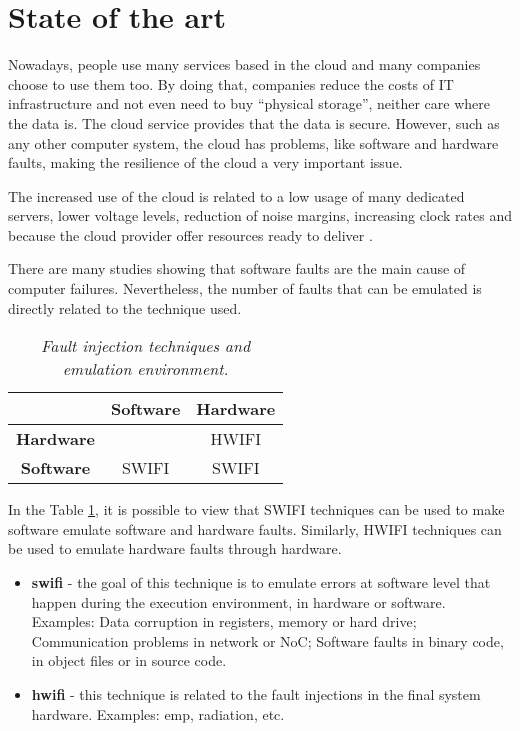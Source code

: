 \newpage
\section{State of the art}

Nowadays, people use many services based in the cloud and many companies choose to use them too. By doing that, companies reduce the costs of IT infrastructure and not even need to buy ``physical storage'', neither care where the data is. The cloud service provides that the data is secure.
However, such as any other computer system, the cloud has problems, like software and hardware faults, making the resilience of the cloud a very important issue.


The increased use of the cloud is related to a low usage of many dedicated servers, lower voltage levels, reduction of noise margins, increasing clock rates and because the cloud provider offer resources ready to deliver \cite{wolter2012resilience}.

There are many studies showing that software faults\cite{avizzienisbasic} are the main cause of computer failures. Nevertheless, the number of faults that can be emulated is directly related to the technique used.

\begin{table}[h]
\centering
\begin{tabular}{c|c|c}
         & \textbf{Software} & \textbf{Hardware} \\ \hline
\textbf{Hardware} &          & HWIFI    \\ \hline
\textbf{Software} & SWIFI    & SWIFI
\end{tabular}
\caption{\small \sl Fault injection techniques and emulation environment.}
\label{tab:swifi_hwifi}
\end{table}

In the Table \ref{tab:swifi_hwifi}, it is possible to view that SWIFI techniques can be used to make software emulate software and hardware faults. Similarly, HWIFI techniques can be used to emulate hardware faults through hardware.

\begin{itemize}
	\item \textbf{\ac{swifi}} - the goal of this technique is to emulate errors at software level that happen during the execution environment, in hardware or software. Examples: Data corruption in registers, memory or hard drive; Communication problems in network or NoC; Software faults in binary code, in object files or in source code.

	\item \textbf{\ac{hwifi}} - this technique is related to the fault injections in the final system hardware. Examples: \ac{emp}, radiation, etc.

\end{itemize}

